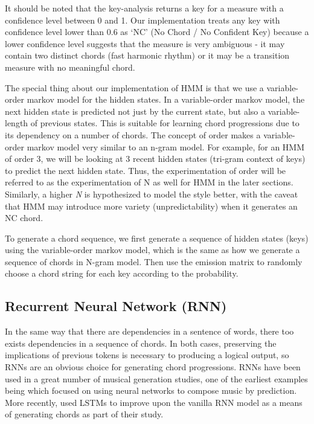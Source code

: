 \documentclass[11pt,a4paper]{article}
\begin{document}
It should be noted that the key-analysis returns a key for a measure with a confidence level between 0 and 1. Our implementation treats any key with confidence level lower than 0.6 as ‘NC’ (No Chord / No Confident Key) because a lower confidence level suggests that the measure is very ambiguous - it may contain two distinct chords (fast harmonic rhythm) or it may be a transition measure with no meaningful chord.

The special thing about our implementation of HMM is that we use a variable-order markov model for the hidden states. In a variable-order markov model, the next hidden state is predicted not just by the current state, but also a variable-length of previous states. This is suitable for learning chord progressions due to its dependency on a number of chords. The concept of order makes a variable-order markov model very similar to an n-gram model. For example, for an HMM of order 3, we will be looking at 3 recent hidden states (tri-gram context of keys) to predict the next hidden state. Thus, the experimentation of order will be referred to as the experimentation of N as well for HMM in the later sections. Similarly, a higher \emph{N} is hypothesized to model the style better, with the caveat that HMM may introduce more variety (unpredictability) when it generates an NC chord.

To generate a chord sequence, we first generate a sequence of hidden states (keys) using the variable-order markov model, which is the same as how we generate a sequence of chords in N-gram model. Then use the emission matrix to randomly choose a chord string for each key according to the probability. 


\subsection{Recurrent Neural Network (RNN)}
In the same way that there are dependencies in a sentence of words, there too exists dependencies in a sequence of chords. In both cases, preserving the implications of previous tokens is necessary to producing a logical output, so RNNs are an obvious choice for generating chord progressions. RNNs have been used in a great number of musical generation studies, one of the earliest examples being \citet{mozer1994} which focused on using neural networks to compose music by prediction. More recently, \citet{brunner2017} used LSTMs to improve upon the vanilla RNN model as a means of generating chords as part of their study.
\end{document}
